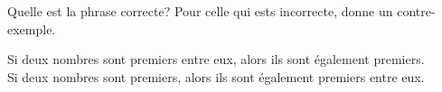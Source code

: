 %
%
Quelle est la phrase correcte? Pour celle qui ests incorrecte, donne un contre-exemple.
    \begin{qcm}
        \choice Si deux nombres sont premiers entre eux, alors ils sont également premiers.\\
        \choice Si deux nombres sont premiers, alors ils sont également premiers entre eux.
    \end{qcm}
